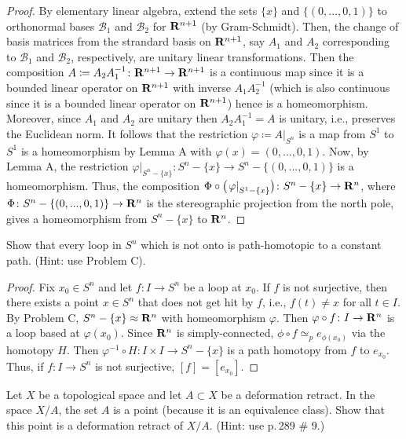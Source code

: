 \begin{proof}
By elementary linear algebra, extend the sets $\{x\}$ and
$\{(0,...,0,1)\}$ to orthonormal bases $\mathcal{B}_1$ and
$\mathcal{B}_2$ for $\mathbf{R}^{n+1}$ (by Gram-Schmidt). Then, the
change of basis matrices from the strandard basis on $\mathbf{R}^{n+1}$,
say $A_1$ and $A_2$ corresponding to $\mathcal{B}_1$ and
$\mathcal{B}_2$, respectively, are unitary linear
transformations. Then the composition $A\coloneqq
A_2A_1^{-1}\colon\mathbf{R}^{n+1}\to\mathbf{R}^{n+1}$ is a continuous map since
it is a bounded linear operator on $\mathbf{R}^{n+1}$ with inverse
$A_1A_2^{-1}$ (which is also continuous since it is a bounded
linear operator on $\mathbf{R}^{n+1}$) hence is a
homeomorphism. Moreover, since $A_1$ and $A_2$ are unitary then
$A_2A_1^{-1}=A$ is unitary, i.e., preserves the Euclidean
norm. It follows that the restriction
$\varphi\coloneqq\left.A\right|_{S^n}$ is a map from $S^1$ to $S^1$
is a homeomorphism by Lemma A with $\varphi(x)=(0,...,0,1)$. Now,
by Lemma A, the restriction
$\left.\varphi\right|_{S^n-\{x\}}\colon S^n-\{x\}\to
S^n-\{(0,...,0,1)\}$ is a homeomorphism. Thus, the composition
$\Phi\circ\bigl(\left.\varphi\right|_{S^1-\{x\}}\bigr)\colon
S^n-\{x\}\to\mathbf{R}^n$, where $\Phi\colon S^n-\{(0,...,0,1)\}\to\mathbf{R}^n$
is the stereographic projection from the north pole, gives a
homeomorphism from $S^n-\{x\}$ to $\mathbf{R}^n$.
\end{proof}
\newpage
\begin{problem}[(D)]
Show that every loop in $S^n$ which is not onto is path-homotopic to a
constant path. (Hint: use Problem C).
\end{problem}
\begin{proof}
Fix $x_0\in S^n$ and let $f\colon I\to S^n$ be a loop at
$x_0$. If $f$ is not surjective, then there exists a point $x\in
S^{n}$ that does not get hit by $f$, i.e., $f(t)\neq x$ for all
$t\in I$. By Problem C, $S^n-\{x\}\approx\mathbf{R}^n$ with
homeomorphism $\varphi$. Then $\varphi\circ f\colon I\to\mathbf{R}^n$ is
a loop based at $\varphi(x_0)$. Since $\mathbf{R}^n$ is
simply-connected, $\phi\circ f\simeq_p e_{\phi(x_0)}$ via the
homotopy $H$. Then $\varphi^{-1}\circ H\colon I\times I\to
S^n-\{x\}$ is a path homotopy from $f$ to $e_{x_0}$. Thus, if
$f\colon I\to S^n$ is not surjective, $[f]=[e_{x_0}]$.
\end{proof}
\newpage
\begin{problem}[(E)]
Let $X$ be a topological space and let $A\subset X$ be a deformation
retract. In the space $X/A$, the set $A$ is a point (because it is an
equivalence class). Show that this point is a deformation retract of
$X/A$. (Hint: use p.\,289 \# 9.)
\end{problem}
